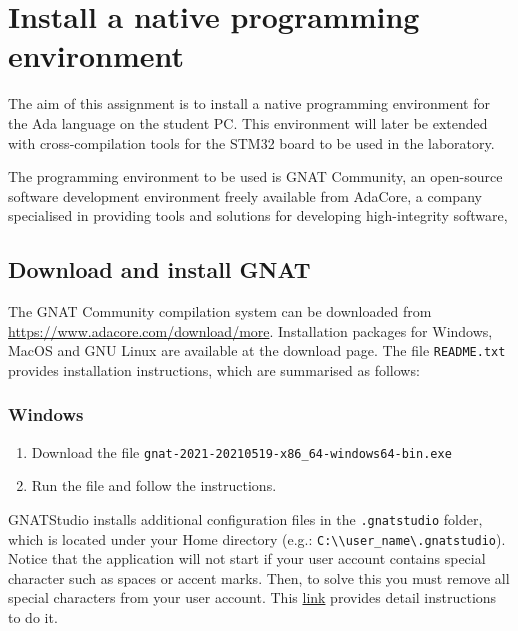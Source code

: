 \chapter{Install a native programming environment}\label{ch:Assignment1}

The aim of this assignment is to install a native programming environment for the Ada language on the student PC. This environment will later be extended with cross-compilation tools for the STM32 board to be used in the laboratory. 

The programming environment to be used is GNAT Community, an open-source software development environment freely available from AdaCore, a company specialised in providing tools and solutions for developing high-integrity software,
\section{Download and install GNAT}
The GNAT Community compilation system can be downloaded from \url{https://www.adacore.com/download/more}. Installation packages for Windows, MacOS and GNU Linux are available at the download page. The file {\tt README.txt} provides installation instructions, which are summarised as follows:
\subsection{Windows}
\begin{enumerate}
\item Download the file {\tt gnat-2021-20210519-x86\_64-windows64-bin.exe}
\item Run the file and follow the instructions.
\end{enumerate}

GNATStudio installs additional configuration files in the \texttt{.gnatstudio} folder,
which is located under your Home directory (e.g.: \texttt{C:\textbackslash{}\textbackslash{}user\_name\textbackslash{}.gnatstudio}).
Notice that the application will not start if your user account contains special character such as spaces or accent marks.
Then, to solve this you must remove all special characters from your user account.
This 
\href{https://superuser.com/questions/890812/how-to-rename-the-user-folder-in-windows-10/1346983#1346983}
{link}
provides detail instructions to do it.

